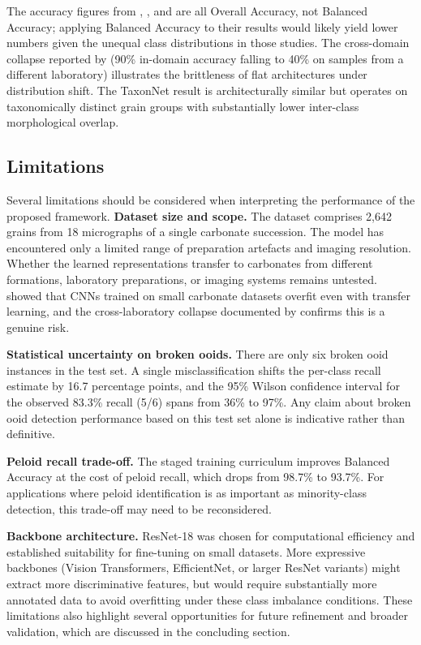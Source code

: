 \documentclass[a4paper,fleqn]{cas-dc}
\begin{document}
The accuracy figures from \citet{pireslima2020}, \citet{ho2023}, and \citet{liudunham2023} are all Overall Accuracy, not Balanced Accuracy; applying Balanced Accuracy to their results would likely yield lower numbers given the unequal class distributions in those studies. The cross-domain collapse reported by \citet{pireslima2020} (90\% in-domain accuracy falling to 40\% on samples from a different laboratory) illustrates the brittleness of flat architectures under distribution shift. The TaxonNet result \citep{ho2023} is architecturally similar but operates on taxonomically distinct grain groups with substantially lower inter-class morphological overlap.

\subsection{Limitations}
Several limitations should be considered when interpreting the performance of the proposed framework.
\textbf{Dataset size and scope.} The dataset comprises 2,642 grains from 18 micrographs of a single carbonate succession. The model has encountered only a limited range of preparation artefacts and imaging resolution. Whether the learned representations transfer to carbonates from different formations, laboratory preparations, or imaging systems remains untested. \citet{dawson2023dataset} showed that CNNs trained on small carbonate datasets overfit even with transfer learning, and the cross-laboratory collapse documented by \citet{pireslima2020} confirms this is a genuine risk.

\textbf{Statistical uncertainty on broken ooids.} There are only six broken ooid instances in the test set. A single misclassification shifts the per-class recall estimate by 16.7 percentage points, and the 95\% Wilson confidence interval for the observed 83.3\% recall (5/6) spans from 36\% to 97\%. Any claim about broken ooid detection performance based on this test set alone is indicative rather than definitive.

\textbf{Peloid recall trade-off.} The staged training curriculum improves Balanced Accuracy at the cost of peloid recall, which drops from 98.7\% to 93.7\%. For applications where peloid identification is as important as minority-class detection, this trade-off may need to be reconsidered.

\textbf{Backbone architecture.} ResNet-18 was chosen for computational efficiency and established suitability for fine-tuning on small datasets. More expressive backbones (Vision Transformers, EfficientNet, or larger ResNet variants) might extract more discriminative features, but would require substantially more annotated data to avoid overfitting under these class imbalance conditions. These limitations also highlight several opportunities for future refinement and broader validation, which are discussed in the concluding section.
\end{document}
